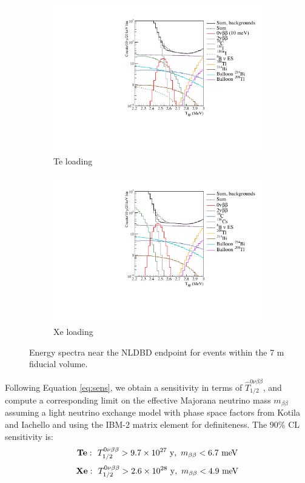 \begin{figure}
\centering
\begin{subfigure}[b]{0.49\textwidth}
 \includegraphics[width=\textwidth]{dbd/spectrum_plot_te.pdf}
 \caption{Te loading}
 \label{fig:spectrum-te}
\end{subfigure}
\begin{subfigure}[b]{0.49\textwidth}
 \includegraphics[width=\textwidth]{dbd/spectrum_plot_xe.pdf}
 \caption{Xe loading}
 \label{fig:spectrum-xe}
\end{subfigure}
\caption{Energy spectra near the NLDBD endpoint for events within the 7 m
fiducial volume.}
\label{fig:spectrum-plots}
\end{figure}

Following Equation \ref{eq:sens}, we obtain a sensitivity in terms of
$\hat{T}_{1/2}^{0\nu\beta\beta}$, and compute a corresponding limit on
the effective Majorana neutrino mass $m_{\beta\beta}$ assuming a light
neutrino exchange model with phase space factors from
Kotila and Iachello \cite{2012PhRvC..85c4316K} and using the IBM-2 matrix
element \cite{Barea:2013wb} for definiteness. The 90\% CL sensitivity
is:
\[
\mathrm{\bf Te:}~~
  T_{1/2}^{0\nu\beta\beta} > 9.7\times10^{27}~\mathrm{y},~
  m_{\beta\beta} < 6.7~\mathrm{meV}
\]
\[
\mathrm{\bf Xe:}~~
  T_{1/2}^{0\nu\beta\beta} > 2.6\times10^{28}~\mathrm{y},~
  m_{\beta\beta} < 4.9~\mathrm{meV}
\]

